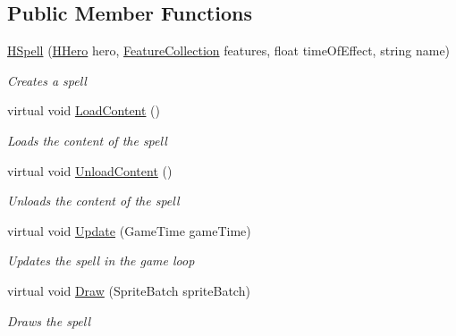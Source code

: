 \subsection*{Public Member Functions}
\begin{DoxyCompactItemize}
\item 
\hyperlink{class_hel_project_1_1_game_world_1_1_spells_1_1_h_spell_a0320952c7e7ed4bda12288dc6f9e0f62}{H\+Spell} (\hyperlink{class_hel_project_1_1_game_world_1_1_entities_1_1_h_hero}{H\+Hero} hero, \hyperlink{class_hel_project_1_1_features_1_1_feature_collection}{Feature\+Collection} features, float time\+Of\+Effect, string name)
\begin{DoxyCompactList}\small\item\em Creates a spell \end{DoxyCompactList}\item 
virtual void \hyperlink{class_hel_project_1_1_game_world_1_1_spells_1_1_h_spell_a2c30200e62a6a938156035098a9c6a1f}{Load\+Content} ()
\begin{DoxyCompactList}\small\item\em Loads the content of the spell \end{DoxyCompactList}\item 
virtual void \hyperlink{class_hel_project_1_1_game_world_1_1_spells_1_1_h_spell_a760e3d340c43f234465d07e2782e3e3a}{Unload\+Content} ()
\begin{DoxyCompactList}\small\item\em Unloads the content of the spell \end{DoxyCompactList}\item 
virtual void \hyperlink{class_hel_project_1_1_game_world_1_1_spells_1_1_h_spell_a19c9c7c407b20861184ef8538614142b}{Update} (Game\+Time game\+Time)
\begin{DoxyCompactList}\small\item\em Updates the spell in the game loop \end{DoxyCompactList}\item 
virtual void \hyperlink{class_hel_project_1_1_game_world_1_1_spells_1_1_h_spell_a71cfca2b0bd3d7bcc91d8fae7180a21f}{Draw} (Sprite\+Batch sprite\+Batch)
\begin{DoxyCompactList}\small\item\em Draws the spell \end{DoxyCompactList}\end{DoxyCompactItemize}
